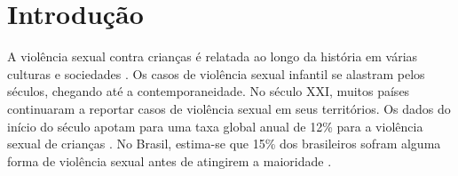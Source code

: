 \chapter{Introdução}\label{ch:Introducao}


A violência sexual contra crianças é relatada ao longo da história em várias culturas e sociedades \cite{walker1988physically, aded2006abuso}. Os casos de violência sexual infantil se alastram pelos séculos, chegando até a contemporaneidade. No século XXI, muitos países continuaram a reportar casos de violência sexual em seus territórios. Os dados do início do século apotam para uma taxa global anual de 12\% para a violência sexual de crianças \cite{stoltenborgh2011global, azzopardi2019meta}. No Brasil, estima-se que 15\% dos brasileiros sofram alguma forma de violência sexual antes de atingirem a maioridade
\cite{brasilia2020}.




